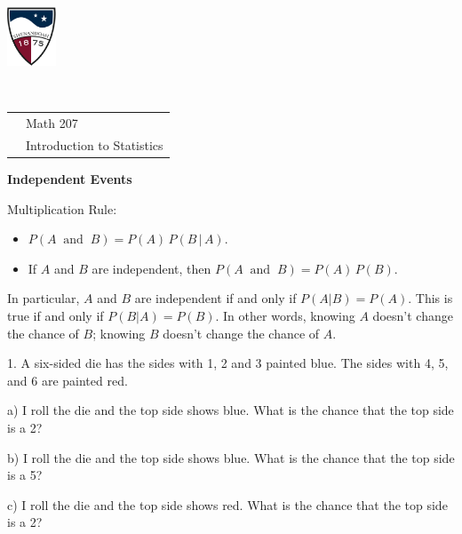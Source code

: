 \documentclass[10pt]{article}
\begin{document}
\pagestyle{empty}
\lstset{language=R, showspaces=false, showstringspaces=false}


\href{http://www.su.edu}{\includegraphics[height=1.75cm]{sulogo.eps}}
\vspace{-1.79cm}

{{\ }\hfill \small
\begin{tabular}{cl}
& Math 207\\
& Introduction to Statistics\\
\end{tabular}
}
\setlength{\baselineskip}{1.05\baselineskip}
\bigskip

\begin{center}
\textbf{\large  Independent Events}
\end{center}

Multiplication Rule:  
\begin{itemize}
\item $P(A\;\;\mbox{and}\;\;B)=P(A)\,P(B\,\vert\,A)$.
\item If $A$ and $B$ are independent, then $P(A\;\;\mbox{and}\;\;B)=P(A)\,P(B)$.
\end{itemize}
In particular, $A$ and $B$ are independent if and only if $P(A\vert B)=P(A)$.
This is true if and only if $P(B\vert A)=P(B)$.  In other words, knowing $A$ doesn't change
the chance of $B$; knowing $B$ doesn't change the chance of $A$.
\bigskip


\newcommand{\ticket}[2]{\psframe(0,0)(0.5,0.5)\psframe(0.5,0)(1,0.5)\rput(0.25,0.25){#1}\rput(0.75,0.25){#2}}

1. A six-sided die has the sides with 1, 2 and 3 painted blue.  The sides with 4, 5, and 6
are painted red.

\hspace{10pt} a) I roll the die and the top side shows blue.  What is the chance that the
 top side is a 2?
\vspace{.3in}

\hspace{10pt} b) I roll the die and the top side shows blue.  What is the chance that the
 top side is a 5?
 \vspace{.3in}

\hspace{10pt} c) I roll the die and the top side shows red.  What is the chance that the
 top side is a 2?
\vspace{.3in}
\end{document}
